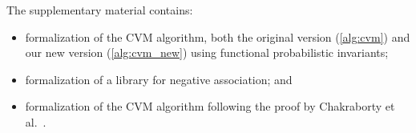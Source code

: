 The supplementary material contains:
\begin{itemize}
\item formalization of the CVM algorithm, both the original version (\cref{alg:cvm}) and our new version (\cref{alg:cvm_new}) using functional probabilistic invariants;
\item formalization of a library for negative association; and %
\item formalization of the CVM algorithm following the proof by Chakraborty et al.~\cite{chakraborty2022,chakraborty2023}.
\end{itemize}



